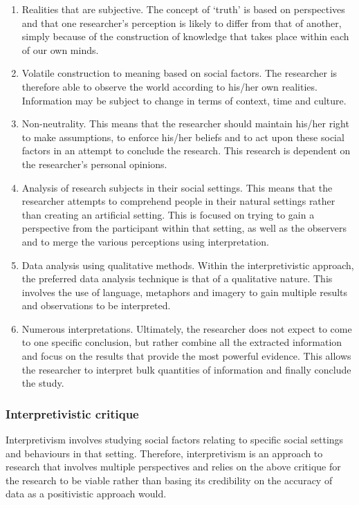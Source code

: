 \begin{enumerate}[label=\roman*.]
\item Realities that are subjective. The concept of ‘truth’ is based on perspectives and that one researcher's perception is likely to differ from that of another, simply because of the construction of knowledge that takes place within each of our own minds.
\item Volatile construction to meaning based on social factors. The researcher is therefore able to observe the world according to his/her own realities. Information may be subject to change in terms of context, time and culture.
\item Non-neutrality. This means that the researcher should maintain his/her right to make assumptions, to enforce his/her beliefs and to act upon these social factors in an attempt to conclude the research. This research is dependent on the researcher’s personal opinions.
\item Analysis of research subjects in their social settings. This means that the researcher attempts to comprehend people in their natural settings rather than creating an artificial setting. This is focused on trying to gain a perspective from the participant within that setting, as well as the observers and to merge the various perceptions using interpretation.
\item Data analysis using qualitative methods. Within the interpretivistic approach, the preferred data analysis technique is that of a qualitative nature. This involves the use of language, metaphors and imagery to gain multiple results and observations to be interpreted.
\item Numerous interpretations. Ultimately, the researcher does not expect to come to one specific conclusion, but rather combine all the extracted information and focus on the results that provide the most powerful evidence. This allows the researcher to interpret bulk quantities of information and finally conclude the study.
\end{enumerate}

\subsubsection{Interpretivistic critique}
Interpretivism involves studying social factors relating to specific social settings and behaviours in that setting. Therefore, interpretivism is an approach to research that involves multiple perspectives and relies on the above critique for the research to be viable rather than basing its credibility on the accuracy of data as a positivistic approach would.
